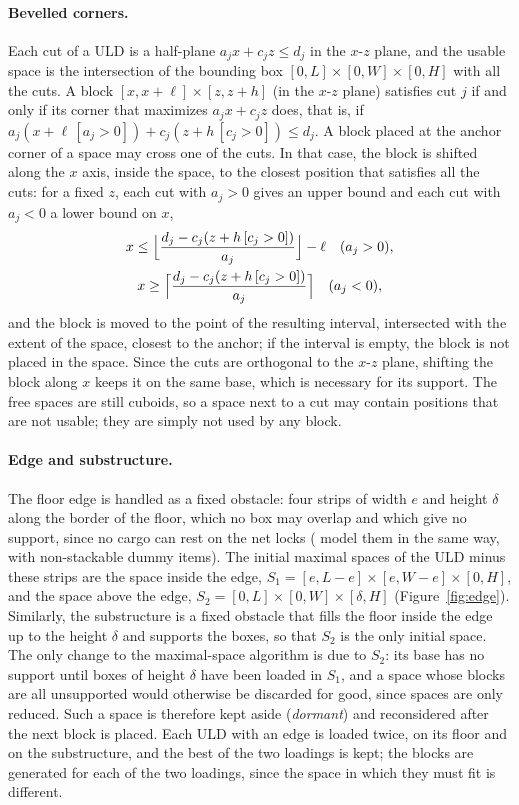 \paragraph{Bevelled corners.}
Each cut of a ULD is a half-plane $a_j x + c_j z \le d_j$ in the $x$-$z$ plane, and the usable space
is the intersection of the bounding box $[0, L] \times [0, W] \times [0, H]$ with all the cuts. A
block $[x, x+\ell] \times [z, z+h]$ (in the $x$-$z$ plane) satisfies cut $j$ if and only if its
corner that maximizes $a_j x + c_j z$ does, that is, if
$a_j (x + \ell\,[a_j > 0]) + c_j (z + h\,[c_j > 0]) \le d_j$. A block placed at the anchor corner
of a space may cross one of the cuts. In that case, the block is shifted along the $x$ axis,
inside the space, to the closest position that satisfies all the cuts: for a fixed $z$, each
cut with $a_j > 0$ gives an upper bound and each cut with $a_j < 0$ a lower bound on $x$,
\begin{gather*}
x \le \Bigl\lfloor \frac{d_j - c_j (z + h\,[c_j > 0])}{a_j} \Bigr\rfloor - \ell \quad (a_j > 0),
\\
x \ge \Bigl\lceil \frac{d_j - c_j (z + h\,[c_j > 0])}{a_j} \Bigr\rceil \quad (a_j < 0),
\end{gather*}
and the block is moved to the point of the resulting interval, intersected with the extent of
the space, closest to the anchor; if the interval is empty, the block is not placed in the
space. Since the cuts are
orthogonal to the $x$-$z$ plane, shifting the block along $x$ keeps it on the same base, which
is necessary for its support. The free spaces are still cuboids, so a space next to a cut may
contain positions that are not usable; they are simply not used by any block.

\paragraph{Edge and substructure.}
The floor edge is handled as a fixed obstacle: four strips of width $e$ and height $\delta$ along
the border of the floor, which no box may overlap and which give no support, since no cargo can
rest on the net locks (\citet{Hessler2025} model them in the same way, with non-stackable dummy
items). The initial maximal
spaces of the ULD minus these strips are the space inside the edge,
$S_1 = [e, L-e] \times [e, W-e] \times [0, H]$, and the space above the edge,
$S_2 = [0, L] \times [0, W] \times [\delta, H]$ (Figure~\ref{fig:edge}). Similarly, the
substructure is a fixed obstacle that fills the floor inside the edge up to the height $\delta$
and supports the boxes, so that $S_2$ is the only initial space. The only change to the
maximal-space algorithm is due to $S_2$: its base has no support until boxes of height $\delta$
have been loaded in $S_1$, and a space whose blocks are all unsupported would otherwise be
discarded for good, since spaces are only reduced. Such a space is therefore kept aside
(\emph{dormant}) and reconsidered after the next block is placed. Each ULD with an edge is loaded
twice, on its floor and on the substructure, and the best of the two loadings is kept; the blocks
are generated for each of the two loadings, since the space in which they must fit is different.


